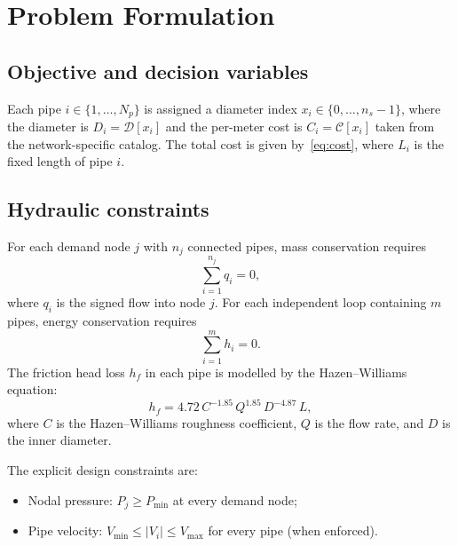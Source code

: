 \documentclass[conference]{IEEEtran}
\begin{document}
\section{Problem Formulation}
\label{sec:formulation}
\subsection{Objective and decision variables}
Each pipe $i\in\{1,\dots,N_p\}$ is assigned a diameter index $x_i\in\{0,\dots,n_s-1\}$, where the diameter is $D_i = \mathcal{D}[x_i]$ and the per-meter cost is $C_i = \mathcal{C}[x_i]$ taken from the network-specific catalog. The total cost is given by~\eqref{eq:cost}, where $L_i$ is the fixed length of pipe $i$.

\subsection{Hydraulic constraints}
For each demand node $j$ with $n_j$ connected pipes, mass conservation requires
\begin{equation}
\sum_{i=1}^{n_j} q_i = 0,
\label{eq:mass}
\end{equation}
where $q_i$ is the signed flow into node $j$. For each independent loop containing $m$ pipes, energy conservation requires
\begin{equation}
\sum_{i=1}^{m} h_i = 0.
\label{eq:energy}
\end{equation}
The friction head loss $h_f$ in each pipe is modelled by the Hazen--Williams equation:
\begin{equation}
h_f = 4.72\,C^{-1.85}\,Q^{1.85}\,D^{-4.87}\,L,
\label{eq:hw}
\end{equation}
where $C$ is the Hazen--Williams roughness coefficient, $Q$ is the flow rate, and $D$ is the inner diameter.

The explicit design constraints are:
\begin{itemize}
\item Nodal pressure: $P_j \geq P_{\min}$ at every demand node;
\item Pipe velocity: $V_{\min} \leq |V_i| \leq V_{\max}$ for every pipe (when enforced).
\end{itemize}
\end{document}
